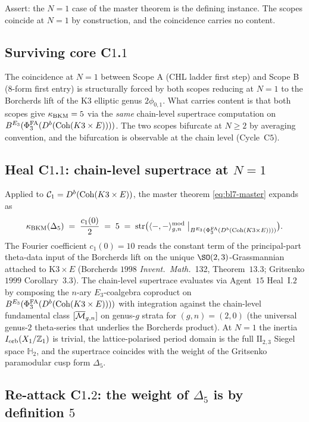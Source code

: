 Assert: the $N = 1$ case of the master theorem is the defining
instance. The scopes coincide at $N = 1$ by construction, and the
coincidence carries no content.

\subsection*{Surviving core C$1$.$1$}

The coincidence at $N = 1$ between Scope A (CHL ladder first step) and
Scope B (8-form first entry) is structurally forced by both scopes
reducing at $N = 1$ to the Borcherds lift of the K$3$ elliptic genus
$2\phi_{0, 1}$. What carries content is that both scopes give
$\kappa_{\mathrm{BKM}} = 5$ via the \emph{same} chain-level supertrace computation on
$B^{E_{3}}(\Phi^{\mathrm{FA}}_{3}(D^b(\mathrm{Coh}(K3 \times E))))$. The two scopes bifurcate at
$N \geq 2$ by averaging convention, and the bifurcation is observable
at the chain level (Cycle~C$5$).

\subsection*{Heal C$1$.$1$: chain-level supertrace at $N = 1$}

Applied to $\mathcal{C}_1 = D^b(\mathrm{Coh}(K3 \times E))$, the master theorem
\eqref{eq:bl7-master} expands as
\[
 \kappa_{\mathrm{BKM}}(\Delta_5) \;=\; \frac{c_1(0)}{2} \;=\; 5 \;=\;
    \mathrm{str}\bigl(
        \langle -, - \rangle^{\mathrm{mod}}_{g, n}
        \bigm|_{B^{E_{3}}(\Phi^{\mathrm{FA}}_{3}(D^b(\mathrm{Coh}(K3 \times E))))}
    \bigr).
\]
The Fourier coefficient $c_1(0) = 10$ reads the constant term of the
principal-part theta-data input of the Borcherds lift on the unique
$\SO(2, 3)$-Grassmannian attached to K$3 \times E$ (Borcherds $1998$
\emph{Invent.~Math.}~132, Theorem~$13.3$; Gritsenko $1999$ Corollary~$3.3$).
The chain-level supertrace evaluates via Agent~$15$ Heal~I.$2$ by
composing the $n$-ary $E_3$-coalgebra coproduct on
$B^{E_{3}}(\Phi^{\mathrm{FA}}_{3}(D^b(\mathrm{Coh}(K3 \times E))))$ with integration against the
chain-level fundamental class $[\overline{\mathcal{M}}_{g, n}]$ on genus-$g$ strata for
$(g, n) = (2, 0)$ (the universal genus-$2$ theta-series that underlies
the Borcherds product). At $N = 1$ the inertia $I_{\mathrm{orb}}(X_1 / \mathbb{Z}_1)$
is trivial, the lattice-polarised period domain is the full
$\mathrm{II}_{2, 3}$ Siegel space $\mathbb{H}_2$, and the supertrace
coincides with the weight of the Gritsenko paramodular cusp form
$\Delta_5$.

\subsection*{Re-attack C$1$.$2$: the weight of $\Delta_5$ is by
definition $5$}


